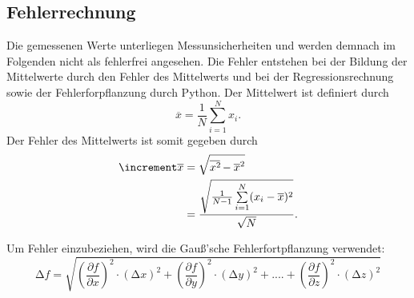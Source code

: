 \subsection{Fehlerrechnung}
Die gemessenen Werte unterliegen Messunsicherheiten und werden demnach im
Folgenden nicht als fehlerfrei angesehen. Die Fehler entstehen bei der
Bildung der Mittelwerte durch den Fehler des Mittelwerts und bei der
Regressionsrechnung sowie der Fehlerforpflanzung durch Python.
Der Mittelwert ist definiert durch
\begin{equation}
    \overline{x} = \frac{1}{N} \sum\limits_{i=1}^N x_i.
\end{equation}
\noindent Der Fehler des Mittelwerts ist somit gegeben durch 
\begin{equation}
    \begin{aligned}
        \increment \overline{x} &= \sqrt{\overline{x^2\kern-0.1em} - \overline{x}^2} \\
                            &= \frac{\sqrt{\frac{1}{N-1} \sum\limits_{i=1}^N (x_i - \overline{x})^2}}{\sqrt{N}}.
    \end{aligned}
\end{equation}

Um Fehler einzubeziehen, wird die Gauß'sche Fehlerfortpflanzung verwendet:
\begin{equation}
    \label{eqn:9}
    \increment f = \sqrt{\left(\frac{\partial f}{\partial x}\right)^2 \cdot \left(\increment x\right)^2 + \left(\frac{\partial f}{\partial y}\right)^2 \cdot \left(\increment y\right)^2 + .... + \left(\frac{\partial f}{\partial z}\right)^2 \cdot \left(\increment z\right)^2}
\end{equation}